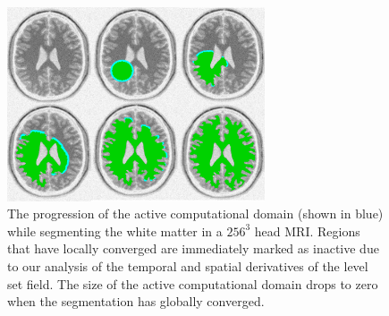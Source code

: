 \documentclass{egpubl}
\begin{document}
{{%




\begin{figure}[t]
\centering
\includegraphics[width=3.0in]{figures/Brainweb-2D-Composite-2-3.png}
\caption{The progression of the active computational domain (shown in blue) while segmenting the white matter in a $256^3$ head MRI. Regions that have locally converged are immediately marked as inactive due to our analysis of the temporal and spatial derivatives of the level set field. The size of the active computational domain drops to zero when the segmentation has globally converged.}
\label{fig:brainweb2d}
\end{figure}


}}
\end{document}
